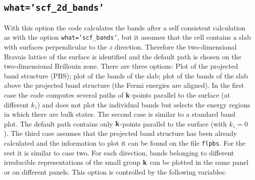 \documentclass[12pt,a4paper]{article}
\begin{document}
\subsection{\texttt{what='scf\_2d\_bands'}}
With this option the code calculates the bands after a self consistent 
calculation as with the option \texttt{what='scf\_bands'}, but it assumes 
that the cell contains a slab with surfaces perpendicular to the $z$ 
direction. Therefore the two-dimensional Bravais lattice of the surface 
is identified and the default path is chosen on the two-dimensional 
Brillouin zone. 
There are three options: Plot of the projected band structure (PBS); 
plot of the bands of the slab; plot of the bands of the slab above the
projected band structure (the Fermi energies are aligned). In the first 
case the code computes several paths
of ${\bf k}$-points parallel to the surface (at different $k_z$) and does 
not plot the individual bands but selects the energy regions in which 
there are bulk states. The second case is similar to a standard band plot. 
The default path contains only ${\bf k}$-points parallel to the 
surface (with $k_z=0$). The third case assumes that the projected band 
structure has been already calculated and the information to plot it 
can be found on the file \texttt{flpbs}. For the rest it is 
similar to case two. For each direction, bands belonging to different 
irreducible representations of the small group ${\bf k}$ can be plotted 
in the same panel or on different panels.
This option is controlled by the following variables:
\end{document}
